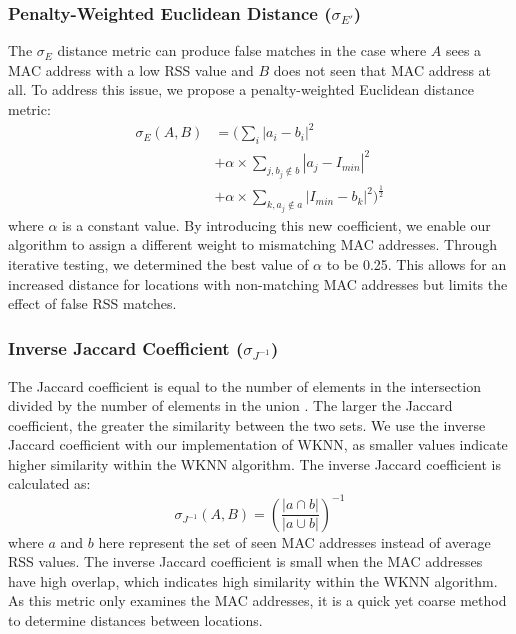 \documentclass[conference]{IEEEtran}
\begin{document}
\subsubsection{Penalty-Weighted Euclidean Distance ($\sigma_{E'}$)}
\indent The $\sigma_E$ distance metric can produce false matches in the case where $A$ sees a MAC address with a low RSS value and $B$ does not seen that MAC address at all. To address this issue, we propose a penalty-weighted Euclidean distance metric:
\begin{equation} \label{eq:penalty_weighted_euclidean}
\begin{split}
\sigma_{E}(A, B) & = (\sum\limits_{i}|a_i-b_i|^2 \\
			& +  \alpha\times\sum\limits_{j, b_j\notin b}|a_j-I_{min}|^2 \\
			& + \alpha\times\sum\limits_{k, a_j\notin a}|I_{min}-b_k|^2)^\frac{1}{2}
\end{split}
\end{equation}
where $\alpha$ is a constant value. By introducing this new coefficient, we enable our algorithm to assign a different weight to mismatching MAC addresses.  Through iterative testing, we determined the best value of $\alpha$ to be 0.25. This allows for an increased distance for locations with non-matching MAC addresses but limits the effect of false RSS matches.
	
\subsubsection{Inverse Jaccard Coefficient ($\sigma_{J^{-1}}$)}
\indent The Jaccard coefficient is equal to the number of elements in the intersection divided by the number of elements in the union \cite{Dunbar}. The larger the Jaccard coefficient, the greater the similarity between the two sets. We use the inverse Jaccard coefficient with our implementation of WKNN, as smaller values indicate higher similarity within the WKNN algorithm. The inverse Jaccard coefficient is calculated as: 
\begin{equation}
\label{eq:jaccard}
\sigma_{J^{-1}}(A, B) = \left(\frac{|a\cap b|}{|a\cup b|}\right)^{-1}
\end{equation}
where $a$ and $b$ here represent the set of seen MAC addresses instead of average RSS values. The inverse Jaccard coefficient is small when the MAC addresses have high overlap, which indicates high similarity within the WKNN algorithm. As this metric only examines the MAC addresses, it is a quick yet coarse method to determine distances between locations.
\end{document}
